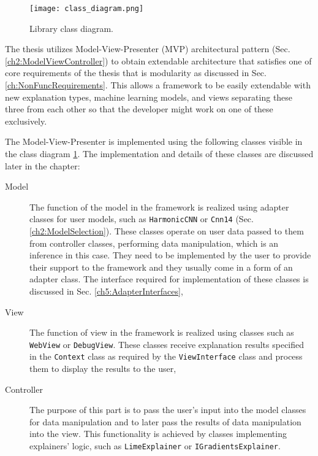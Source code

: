 \documentclass[
    bindingoffset=5mm,  %
    footnoteindent=3mm, %
    hyphenation=true    %
]{src/wut-thesis}
\begin{document}
\begin{figure}%
    \centering
    \texttt{[image: class\_diagram.png]}
    \caption{Library class diagram.}
    \label{fig:ClassDiagram}
\end{figure}

    The thesis utilizes Model-View-Presenter (MVP) architectural pattern
    (Sec. \ref{ch2:ModelViewController}) to obtain extendable architecture that satisfies
    one of core requirements of the thesis that is modularity as discussed in
    Sec. \ref{ch:NonFuncRequirements}. This allows a framework to be easily extendable with 
    new explanation types, machine learning models, and views separating these three from
    each other so that the developer might work on one of these exclusively.

    The Model-View-Presenter is implemented using
    the following classes visible in the class diagram \ref{fig:ClassDiagram}.
    The implementation and details of these classes are discussed later in the chapter:
    \begin{description}
        \item[Model] The function of the model in the framework is realized using adapter classes for user
        models, such as \texttt{HarmonicCNN} or \texttt{Cnn14} (Sec. \ref{ch2:ModelSelection}). These classes
        operate on user data passed to them from controller classes, performing data manipulation, which is an
        inference in this case. They need to be implemented by the user to provide their support to the framework and they usually come in a form of an adapter class.
        The interface required for implementation of these classes is discussed     
        in Sec. \ref{ch5:AdapterInterfaces},

        \item[View] The function of view in the framework is realized using classes such as \texttt{WebView}
        or \texttt{DebugView}. These classes receive explanation results specified in the \texttt{Context}
        class as required by the \texttt{ViewInterface} class and process them to display the results
        to the user,

        \item[Controller] The purpose of this part is to pass the user’s input into the model
        classes for data manipulation and to later pass the results of data manipulation into 
        the view. This functionality is achieved by classes implementing explainers' logic, 
        such as \texttt{LimeExplainer} or \texttt{IGradientsExplainer}.
    \end{description}
\end{document}

